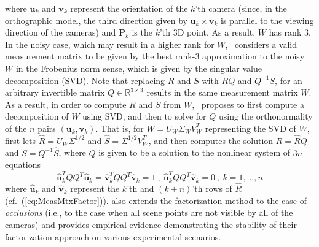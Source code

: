 \documentclass[10pt]{article}
\newcommand{\R}{\ensuremath{\mathbb{R}}}
\begin{document}
where $\mathbf{u}_k$ and $\mathbf{v}_k$ represent the orientation of the $k$'th camera (since, in the orthographic model, the third direction given by $\mathbf{u}_k\times\mathbf{v}_k$ is parallel to the viewing direction of the cameras) and $\mathbf{P}_k$ is the $k$'th $3$D point. As a result, $W$ has rank $3$. In the noisy case, which may result in a higher rank for $W$,~\cite{TomasiKanadeFactor} considers a valid measurement matrix to be given by the best rank-$3$ approximation to the noisy $W$ in the Frobenius norm sense, which is given by the singular value decomposition (SVD). Note that replacing $R$ and $S$ with $RQ$ and $Q^{-1}S$, for an arbitrary invertible matrix $Q\in\R^{3\times3}$ results in the same measurement matrix $W$. As a result, in order to compute $R$ and $S$ from $W$,~\cite{TomasiKanadeFactor} proposes to first compute a decomposition of $W$ using SVD, and then to solve for $Q$ using the orthonormality of the $n$ pairs $(\mathbf{u}_k,\mathbf{v}_k)$. That is, for $W = U_W\Sigma_WV_{W}^T$ representing the SVD of $W$, \cite{TomasiKanadeFactor} first lets $\hat{R} = U_W\Sigma^{1/2}$ and $\hat{S} = \Sigma^{1/2}V_{W}^T$, and then computes the solution $R = \hat{R}Q$ and $S = Q^{-1}\hat{S}$, where $Q$ is given to be a solution to the nonlinear system of $3n$ equations
\begin{equation}
\label{eq:FactorQ}
\hat{\mathbf{u}}_k^TQQ^T\hat{\mathbf{u}}_k = \hat{\mathbf{v}}_k^TQQ^T\hat{\mathbf{v}}_k = 1 \ , \ \hat{\mathbf{u}}_k^TQQ^T\hat{\mathbf{v}}_k = 0 \ , \ k = 1, \ldots, n
\end{equation}
where $\hat{\mathbf{u}}_k$ and $\hat{\mathbf{v}}_k$ represent the $k$'th and $(k+n)$'th rows of $\hat{R}$ (cf.~(\ref{eq:MeasMtxFactor})). \cite{TomasiKanadeFactor} also extends the factorization method to the case of \textit{occlusions} (i.e., to the case when all scene points are not visible by all of the cameras) and provides empirical evidence demonstrating the stability of their factorization approach on various experimental scenarios.
\end{document}
